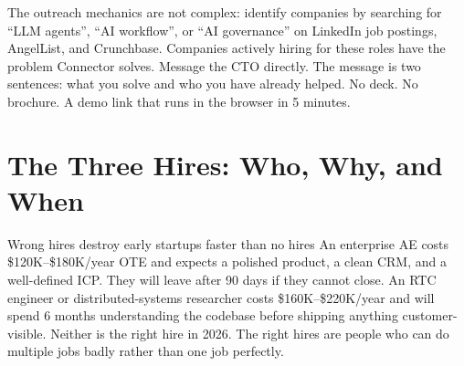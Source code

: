 \noindent The outreach mechanics are not complex: identify companies by
searching for ``LLM agents'', ``AI workflow'', or ``AI governance'' on LinkedIn
job postings, AngelList, and Crunchbase. Companies actively hiring for these
roles have the problem Connector solves. Message the CTO directly. The message
is two sentences: what you solve and who you have already helped. No deck.
No brochure. A demo link that runs in the browser in 5 minutes.

\section*{The Three Hires: Who, Why, and When}

\begin{warnbox}{Wrong hires destroy early startups faster than no hires}
An enterprise AE costs \$120K--\$180K/year OTE and expects a polished product,
a clean CRM, and a well-defined ICP. They will leave after 90 days if they
cannot close. An RTC engineer or distributed-systems researcher costs
\$160K--\$220K/year and will spend 6 months understanding the codebase before
shipping anything customer-visible. Neither is the right hire in 2026. The
right hires are people who can do multiple jobs badly rather than one job
perfectly.
\end{warnbox}

